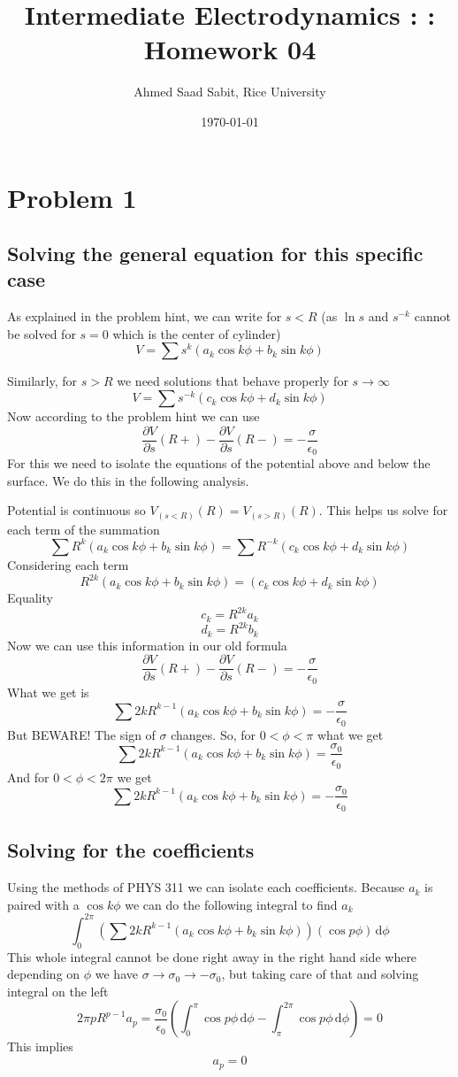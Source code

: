 \documentclass[letter, 10pts]{article}
\title{Intermediate Electrodynamics : : Homework 04}
\author{Ahmed Saad Sabit, Rice University}
\date{\today}
\begin{document}
\maketitle


\section*{Problem 1}
\subsection*{Solving the general equation for this specific case}
As explained in the problem hint, we can write for $s < R$ (as $\ln s$ and $s^{- k }$ cannot be solved for $s = 0$ which is the center of cylinder)
\[
V = \sum s^{k} (a_k  \cos k \phi + b_k \sin k \phi ) 
\] 

Similarly, for $s > R$ we need solutions that behave properly for $s \to  \infty$
\[
V = \sum s^{-k} (c_k \cos k \phi + d_k \sin k \phi) 
\]
Now according to the problem hint we can use 
\[
\frac{\partial V}{\partial s} (R+) - \frac{\partial V}{\partial s} (R-) =  - \frac{\sigma}{\epsilon_0}
\] 
For this we need to isolate the equations of the potential above and below the surface. We do this in the following analysis. 

Potential is continuous so $V_{(s<R)}(R)  = V_{(s>R)}(R)$. This helps us solve for each term of the summation
\[
\sum R^{k} (a_k  \cos k \phi + b_k \sin k \phi ) 
= \sum R^{-k} (c_k \cos k \phi + d_k \sin k \phi) 
\] Considering each term 
\[
 R^{2k} (a_k  \cos k \phi + b_k \sin k \phi ) 
= (c_k \cos k \phi + d_k \sin k \phi) 
\] 
Equality 
\[
c_k = R^{2k} a_k
\] 
\[
d_k = R^{2k} b_k
\] 
Now we can use this information in our old formula 
\[
\frac{\partial V}{\partial s} (R+) - \frac{\partial V}{\partial s} (R-) =  - \frac{\sigma}{\epsilon_0}
\] What we get is 
\[
\sum 
2k R^{k-1} (a_k \cos k \phi + b_k \sin k \phi) = - \frac{\sigma}{\epsilon_0}
\] 
But BEWARE! The sign of $\sigma$ changes. So, for $0<\phi < \pi$ what we get
\[ \sum 
2k R^{k-1} (a_k \cos k \phi + b_k \sin k \phi) = \frac{\sigma_0}{\epsilon_0}
\] 
And for $0 < \phi < 2 \pi $ we get
\[ \sum 
2k R^{k-1} (a_k \cos k \phi + b_k \sin k \phi) = - \frac{\sigma_0}{\epsilon_0}
\] 

\subsection*{Solving for the coefficients} 
Using the methods of PHYS 311 we can isolate each coefficients. Because $a_k$ is paired with a $\cos k \phi$ we can do the following integral to find $a_k$ 
\[ \int_0^{2 \pi } \left(
\sum
2k R^{k-1} (a_k \cos k \phi + b_k \sin k \phi) 
\right) (\cos p \phi) \, \mathrm{d} \phi
\] 
This whole integral cannot be done right away in the right hand side where depending on $\phi$ we have $\sigma \to  \sigma_0 \to  - \sigma_0$, but taking care of that and solving integral on the left
\[
 2 \pi p R^{p - 1} a_p = \frac{\sigma_0}{\epsilon_0} 
 \left(
\int_{0}^{\pi } \cos p \phi \, \mathrm{d} \phi - 
\int_{\pi }^{2 \pi } \cos p \phi \, \mathrm{d}  \phi  
 \right) = 0
\] 
This implies 
\[
	a_p = 0 \tag{for all $p$ }
\] 
\end{document}
